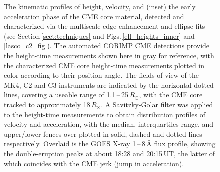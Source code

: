\documentclass[namedreferences]{solarphysics}
\begin{document}
\begin{article}
\begin{figure}[!t]
\caption{The kinematic profiles of height, velocity, and (inset) the early acceleration phase of the CME core material, detected and characterized via the multiscale edge enhancement and ellipse-fits (see Section\,\ref{sect:techniques} and Figs.\,\ref{ell_heights_inner} and \ref{lasco_c2_fig}). The automated CORIMP CME detections provide the height-time measurements shown here in gray for reference, with the characterized CME core height-time measurements plotted in color according to their position angle. The fields-of-view of the MK4, C2 and C3 instruments are indicated by the horizontal dotted lines, covering a useable range of 1.1\,--\,25\,$R_{\odot}$, with the CME core tracked to approximately 18$\,R_{\odot}$. A Savitzky-Golar filter was applied to the height-time measurements to obtain distribution profiles of velocity and acceleration, with the median, interquartiles range, and upper/lower fences over-plotted in solid, dashed and dotted lines respectively. Overlaid is the GOES X-ray 1\,--\,8\,{\AA} flux profile, showing the double-eruption peaks at about 18:28 and 20:15\,UT, the latter of which coincides with the CME jerk (jump in acceleration).}
\label{kins_CMEcore}
\end{figure}



\end{article}
\end{document}
